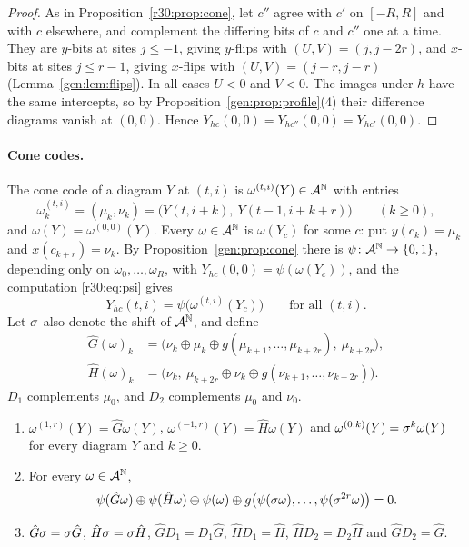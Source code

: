 \begin{proof}
As in Proposition~\ref{r30:prop:cone}, let $c''$ agree with $c'$ on $[-R,R]$ and with $c$ elsewhere, and complement the differing bits of $c$ and $c''$ one at a time. They are $y$-bits at sites $j\le-1$, giving $y$-flips with $(U,V)=(j,j-2r)$, and $x$-bits at sites $j\le r-1$, giving $x$-flips with $(U,V)=(j-r,j-r)$ (Lemma~\ref{gen:lem:flips}). In all cases $U<0$ and $V<0$. The images under $h$ have the same intercepts, so by Proposition~\ref{gen:prop:profile}(4) their difference diagrams vanish at $(0,0)$. Hence $Y_{hc}(0,0)=Y_{hc''}(0,0)=Y_{hc'}(0,0)$.
\end{proof}

\paragraph{Cone codes.} The cone code of a diagram $Y$ at $(t,i)$ is $\omega^{(t,i)}(Y)\in\mathcal{A}^{\mathbb N}$ with entries
\[
\omega^{(t,i)}_k=(\mu_k,\nu_k)=\bigl(Y(t,i+k),\ Y(t-1,i+k+r)\bigr)\qquad(k\ge0),
\]
and $\omega(Y)=\omega^{(0,0)}(Y)$. Every $\omega\in\mathcal{A}^{\mathbb N}$ is $\omega(Y_c)$ for some $c$: put $y(c_k)=\mu_k$ and $x(c_{k+r})=\nu_k$. By Proposition~\ref{gen:prop:cone} there is $\psi\colon\mathcal{A}^{\mathbb N}\to\{0,1\}$, depending only on $\omega_0,\dots,\omega_R$, with $Y_{hc}(0,0)=\psi(\omega(Y_c))$, and the computation \eqref{r30:eq:psi} gives
\begin{equation}\label{gen:eq:psi}
Y_{hc}(t,i)=\psi\bigl(\omega^{(t,i)}(Y_c)\bigr)\qquad\text{for all }(t,i).
\end{equation}
Let $\sigma$ also denote the shift of $\mathcal{A}^{\mathbb N}$, and define
\begin{align*}
\hat G(\omega)_k&=\bigl(\nu_k\oplus\mu_k\oplus g(\mu_{k+1},\dots,\mu_{k+2r}),\ \mu_{k+2r}\bigr),\\
\hat H(\omega)_k&=\bigl(\nu_k,\ \mu_{k+2r}\oplus\nu_k\oplus g(\nu_{k+1},\dots,\nu_{k+2r})\bigr).
\end{align*}
$D_1$ complements $\mu_0$, and $D_2$ complements $\mu_0$ and $\nu_0$.

\begin{lemma}\label{gen:lem:I}
\begin{enumerate}
\item $\omega^{(1,r)}(Y)=\hat G\omega(Y)$, $\omega^{(-1,r)}(Y)=\hat H\omega(Y)$ and $\omega^{(0,k)}(Y)=\sigma^k\omega(Y)$ for every diagram $Y$ and $k\ge0$.
\item For every $\omega\in\mathcal{A}^{\mathbb N}$,
\begin{equation}\label{gen:eq:I}
\psi(\hat G\omega)\oplus\psi(\hat H\omega)\oplus\psi(\omega)\oplus g\bigl(\psi(\sigma\omega),\dots,\psi(\sigma^{2r}\omega)\bigr)=0.
\end{equation}
\item $\hat G\sigma=\sigma\hat G$, $\hat H\sigma=\sigma\hat H$, $\hat GD_1=D_1\hat G$, $\hat HD_1=\hat H$, $\hat HD_2=D_2\hat H$ and $\hat GD_2=\hat G$.
\end{enumerate}
\end{lemma}

